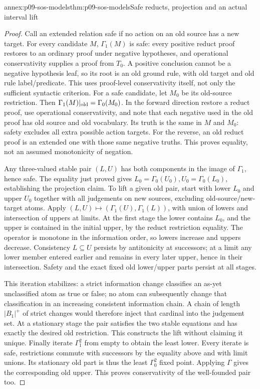 \begin{annexitem}{annex:p09-sos-models}{thm:p09-sos-models}{Safe reducts, projection and an actual interval lift}
\begin{proof}
Call an extended relation safe if no action on an old source has
a new target. For every candidate \(M\), \(\Gamma_1(M)\)
is safe: every positive reduct proof restores to an ordinary proof
under negative hypotheses, and operational conservativity supplies
a proof from \(T_0\). A positive conclusion cannot be a negative
hypothesis leaf, so its root is an old ground rule, with old target
and old rule label/predicate. This uses proof-level conservativity
itself, not only the sufficient syntactic criterion.
For a safe candidate, let \(M_0\) be its old-source restriction.
Then
\(\Gamma_1(M)|_{\rm old}=\Gamma_0(M_0)\).
In the forward direction restore a reduct proof, use operational
conservativity, and note that each negative used in the old proof has old source
and old vocabulary. Its truth is the same in \(M\) and \(M_0\):
safety excludes all extra possible action targets. For the reverse,
an old reduct proof is an extended one with those same negative
truths. This proves equality, not an assumed monotonicity of negation.

Any three-valued stable pair \((L,U)\) has both components in
the image of \(\Gamma_1\), hence safe. The equality just proved
gives \(L_0=\Gamma_0(U_0),U_0=\Gamma_0(L_0)\), establishing
the projection claim. To lift a given old pair, start with lower
\(L_0\) and upper \(U_0\) together with all judgements on
new sources, excluding old-source/new-target atoms. Apply
\((L,U)\mapsto(\Gamma_1(U),\Gamma_1(L))\), with union
of lowers and intersection of uppers at limits. At the first
stage the lower contains \(L_0\), and the upper is contained
in the initial upper, by the reduct restriction equality. The
operator is monotone in the information order, so lowers increase
and uppers decrease. Consistency \(L\subseteq U\) persists
by antitonicity at successors; at a limit any lower member entered
earlier and remains in every later upper, hence in their intersection.
Safety and the exact fixed old lower/upper parts persist at all stages.

This iteration stabilizes: a strict information change classifies
an as-yet unclassified atom as true or false; no atom can subsequently
change that classification in an increasing consistent information
chain. A chain of length \(|B_1|^+\) of strict changes would
therefore inject that cardinal into the judgement set. At a stationary
stage the pair satisfies the two stable equations and has exactly
the desired old restriction. This constructs the lift without
claiming it unique. Finally iterate \(\Gamma_1^2\) from empty
to obtain the least lower. Every iterate is safe, restrictions
commute with successors by the equality above and with limit unions.
Its stationary old part is thus the least \(\Gamma_0^2\)
fixed point. Applying \(\Gamma\) gives the corresponding
old upper. This proves conservativity of the well-founded pair too.
\end{proof}
\end{annexitem}

